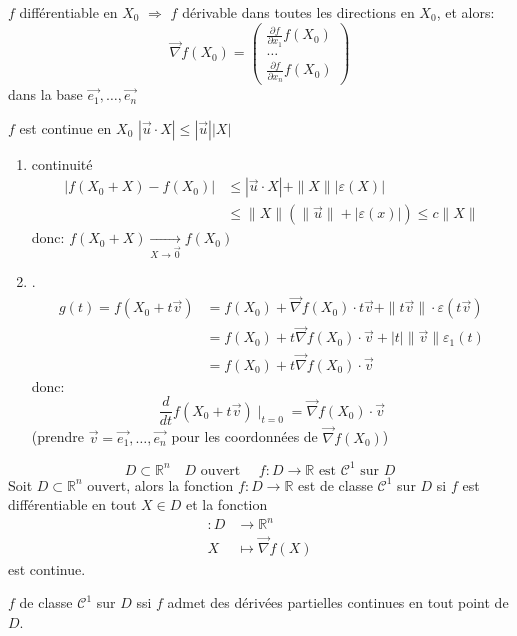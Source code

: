 \documentclass[a4paper]{report}
\newcommand\R{\ensuremath{\mathbb{R}}}
\let\implies\Rightarrow
\let\epsilon\varepsilon
\theoremstyle{definition}
\begin{document}
\begin{prop}
   $f$ différentiable en  $X_0$ $\implies$ $f$ dérivable dans toutes les directions en  $X_0$, et alors: 
   \[
       \vec{\nabla}f(X_0) = \begin{pmatrix} \frac{\partial f}{\partial x_1}f(X_0)\\ \ldots \\  \frac{\partial f}{\partial x_n}f(X_0)\end{pmatrix} 
   \] 
   dans la base $\vec{e_1}, \ldots, \vec{e_n}$
\end{prop}

\begin{preuve}
$f$ est continue en  $X_0$ $|\vec{u} \cdot X| \le |\vec{u}| |X|$
\begin{enumerate}
    \item continuité
        \begin{align*}
            |f(X_0 + X) - f(X_0)| &\le |\vec{u} \cdot X| + \|X\| |\epsilon(X)|\\
                                  &\le \|X\|\left( \|\vec{u}\| + |\epsilon(x)|  \right) \le c\|X\|
        \end{align*}
        donc: $f(X_0 + X) \xrightarrow[X \to \vec{0}]{} f(X_0)$
    \item .
        \begin{align*}
            g(t) = f(X_0 + t \vec{v}) &= f(X_0) + \vec{\nabla}f(X_0) \cdot t \vec{v} + \|t \vec{v}\| \cdot \epsilon(t \vec{v})\\
                                      &= f(X_0) + t\vec{\nabla}f(X_0) \cdot \vec{v} + |t|\|\vec{v}\|\epsilon_1(t)\\
                                      &= f(X_0) + t\vec{\nabla }f(X_0)\cdot \vec{v}
        \end{align*}
        donc:
        \[
            \frac{d}{dt} f(X_0 + t\vec{v})\mid_{t = 0} = \vec{\nabla}f(X_0)\cdot \vec{v}
        \] 
        (prendre $\vec{v} = \vec{e_1}, \ldots, \vec{e_n}$ pour les coordonnées de $\vec{\nabla}f(X_0)$)
\end{enumerate}
\end{preuve}
\begin{definition}
    \[
        D \subset \R^n \quad D \text{ ouvert } \quad f: D \to \R \text{ est } \mathcal{C}^1 \text{ sur } D
    \] 
    Soit $D \subset \R^n$ ouvert, alors la fonction $f: D \to \R$ est de classe $\mathcal{C}^1$ sur  $D$ si 
    $f$ est différentiable en tout  $X \in D$ et la fonction
    \begin{align*}
        : D &\longrightarrow \R^n \\
        X &\longmapsto \vec{\nabla}f(X)
    \end{align*}
    est continue.
\end{definition}
\begin{theorem}
    $f$ de classe  $\mathcal{C}^1$ sur  $D$ ssi  $f$ admet des dérivées partielles continues en tout point de  $D$. 
\end{theorem}
\end{document}
